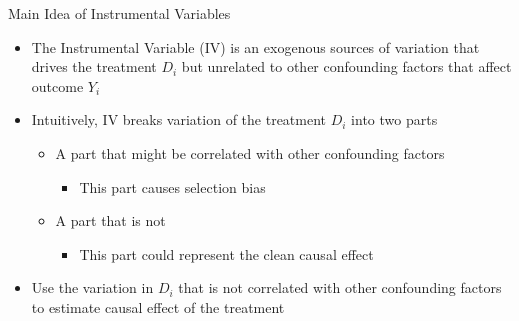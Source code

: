 \documentclass[dvipsnames,hyperref={pdfpagelabels=false}]{beamer}
\begin{document}
\begin{frame}{Main Idea of Instrumental Variables}
	
	\begin{itemize}
		\item The Instrumental Variable (IV) is an exogenous sources of
		variation that drives the treatment $D_{i}$ but unrelated to other confounding factors that affect outcome $Y_{i}$
		\vspace{0.2cm}
		\item Intuitively, IV breaks variation of the treatment $D_{i}$ into two parts
				\vspace{0.2cm}
		\begin{itemize}
			\item[1] A part that might be correlated with other confounding factors 
			\vspace{0.2cm}
			\begin{itemize}		
			\item This part causes selection bias
						\vspace{0.2cm}
					\end{itemize}
			\item[2] A part that is not
			\vspace{0.2cm}
			\begin{itemize}		
				\item This part could represent the clean causal effect
			\end{itemize}
			
		\end{itemize}
		\vspace{0.2cm}
	\item Use the variation in  $D_{i}$ that is not correlated with other confounding factors  to estimate causal effect of the treatment 
		
		
	\end{itemize}
\end{frame}
\end{document}
